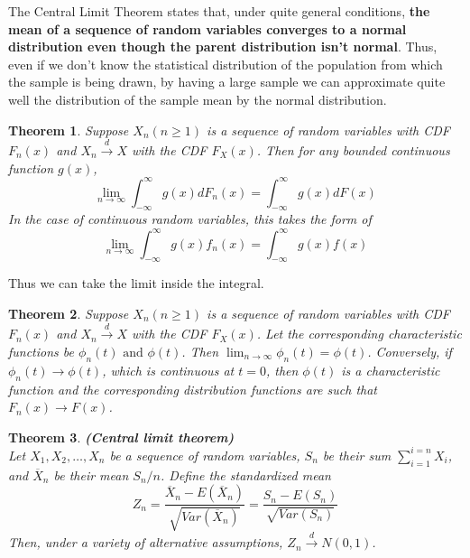 \documentclass{article}
\newtheorem{theorem}{Theorem}[section]
\begin{document}
The Central Limit Theorem states that, under quite general conditions, \textbf{the mean of a sequence of random variables converges to a normal distribution even though the parent distribution isn't normal}. Thus, even if we don't know the statistical distribution of the population from which the sample is being drawn, by having a large sample we can approximate quite well the distribution of the sample mean by the normal distribution.

\begin{theorem}
    Suppose \(X_n (n \geq 1)\) is a sequence of random variables with CDF \(F_n(x)\) and \(X_n \stackrel{d} \longrightarrow X\) with the CDF \(F_X(x)\). Then for any bounded continuous function \(g(x)\),
    \begin{equation*}
        \lim_{n \rightarrow \infty} \int_{-\infty}^{\infty} g(x) dF_n(x)= \int_{-\infty}^{\infty} g(x) dF(x)
    \end{equation*}
    In the case of continuous random variables, this takes the form of
    \begin{equation*}
        \lim_{n \rightarrow \infty} \int_{-\infty}^{\infty} g(x) f_n(x)= \int_{-\infty}^{\infty} g(x) f(x)
    \end{equation*}
\end{theorem}

Thus we can take the limit inside the integral.

\begin{theorem}
    Suppose \(X_n (n \geq 1)\) is a sequence of random variables with CDF \(F_n(x)\) and \(X_n \stackrel{d} \longrightarrow X\) with the CDF \(F_X(x)\). Let the corresponding characteristic functions be \(\phi_n(t) \text{ and } \phi(t)\). Then \(\lim_{n \rightarrow \infty} \phi_n(t)=\phi(t)\). Conversely, if \(\phi_n(t) \rightarrow \phi(t)\), which is continuous at \(t=0\), then \(\phi(t)\) is a characteristic function and the corresponding distribution functions are such that \(F_n(x) \rightarrow F(x)\).
\end{theorem}

\begin{theorem}
    \textbf{(Central limit theorem)}\\
    Let \(X_1,X_2,\dots,X_n\) be a sequence of random variables, \(S_n\) be their sum \(\sum_{i=1}^{i=n} X_i\), and \(\overline{X}_n\) be their mean \(S_n/n\). Define the standardized mean
    \begin{equation*}
        Z_n=\frac{\overline{X}_n-E(\overline{X}_n)}{\sqrt{Var(\overline{X}_n)}} = \frac{S_n-E(S_n)}{\sqrt{Var(S_n)}}
    \end{equation*}
    Then, under a variety of alternative assumptions, \(Z_n \stackrel{d} \longrightarrow N(0,1)\).
\end{theorem}
\end{document}
